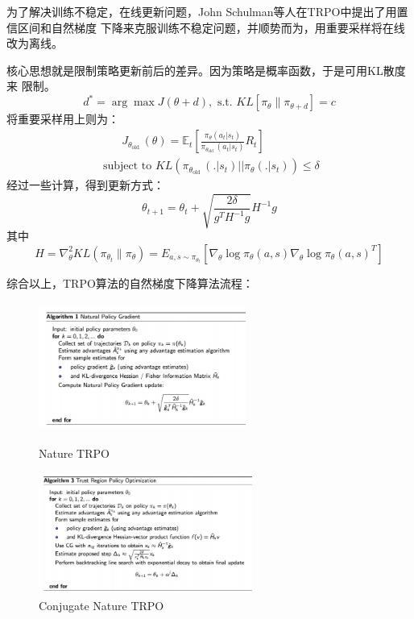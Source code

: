 \documentclass[UTF8]{ctexart}
\begin{document}
为了解决训练不稳定，在线更新问题，John Schulman等人在TRPO中提出了用置信区间和自然梯度
下降来克服训练不稳定问题，并顺势而为，用重要采样将在线改为离线。

核心思想就是限制策略更新前后的差异。因为策略是概率函数，于是可用KL散度来
限制。$$d^{*}=\arg \max J(\theta+d), \text { s.t. } K L\left[\pi_{\theta} \| \pi_{\theta+d}\right]=c$$
将重要采样用上则为：
$$\begin{array}{l}
    \qquad J_{\theta_{\text {old }}}(\theta)=\mathbb{E}_{t}\left[\frac{\pi_{\theta}\left(a_{t} | s_{t}\right)}{\pi_{\theta_{\text {old }}}\left(a_{t} | s_{t}\right)} R_{t}\right] \\
    \text { subject to } K L\left(\pi_{\theta_{\text {old }}}\left(. | s_{t}\right)|| \pi_{\theta}\left(. | s_{t}\right)\right) \leq \delta
    \end{array}
$$
经过一些计算，得到更新方式：
$$\theta_{t+1}=\theta_{t}+\sqrt{\frac{2 \delta}{g^{T} H^{-1} g}} H^{-1} g$$
其中
$$H=\nabla_{\theta}^{2} K L\left(\pi_{\theta_{t}} \| \pi_{\theta}\right)=E_{a, s \sim \pi_{\theta_{t}}}\left[\nabla_{\theta} \log \pi_{\theta}(a, s) \nabla_{\theta} \log \pi_{\theta}(a, s)^{T}\right]$$

综合以上，TRPO算法的自然梯度下降算法流程：

\begin{figure}[htbp]
	\centering
	\begin{minipage}[t]{0.48\textwidth}
	\centering
	\includegraphics[width=6.8cm, height=4.2cm]{./pic/TRPO.png}
    \caption{Nature TRPO}
    \label{Nature:TRPO}
	\end{minipage}
	\begin{minipage}[t]{0.48\textwidth}
		\centering
        \includegraphics[width=7cm, height=4cm]{./pic/TRPO_2.png}
        \caption{Conjugate Nature TRPO}
        \label{Nature:CTRPO}
	\end{minipage}
\end{figure}
\end{document}
